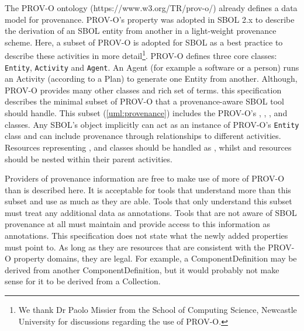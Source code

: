 {The PROV-O ontology (https://www.w3.org/TR/prov-o/) already defines a data model for provenance. PROV-O's  property was adopted in SBOL 2.x to describe the derivation of an SBOL entity from another in a light-weight provenance scheme.  Here, a subset of PROV-O is adopted for SBOL as a best practice to describe these activities in more detail\footnote{We thank Dr Paolo Missier from the School of Computing Science, Newcastle University for discussions regarding the use of PROV-O.}. PROV-O defines three core classes: \texttt{Entity}, \texttt{Activity} and \texttt{Agent}. An Agent (for example a software or a person) runs an Activity (according to a Plan) to generate one Entity from another. Although, PROV-O provides many other classes and rich set of terms. this specification describes the minimal subset of PROV-O that a provenance-aware SBOL tool should handle. This subset (\ref{uml:provenance}) includes the PROV-O's , , ,  and  classes. Any SBOL's  object implicitly can act as an instance of PROV-O's \texttt{Entity} class and can include provenance through relationships to different activities. Resources representing ,  and  classes should be handled as , whilst  and  resources should be nested within their parent activities. 


Providers of provenance information are free to make use of more of PROV-O than is described here. It is acceptable for tools that understand more than this subset and use as much as they are able. Tools that only understand this subset must treat any additional data as annotations. Tools that are not aware of SBOL provenance at all must maintain and provide access to this information as annotations. This specification does not state what the newly added properties must point to. As long as they are resources that are consistent with the PROV-O property domains, they are legal. For example, a ComponentDefinition may be derived from another ComponentDefinition, but it would probably not make sense for it to be derived from a Collection.
}

